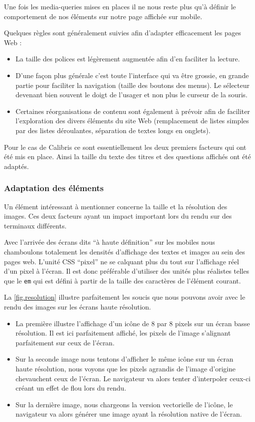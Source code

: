 \documentclass[12pt,a4paper]{book}
\begin{document}
Une fois les media-queries mises en places il ne nous reste plus qu'à définir le comportement de nos éléments sur notre page affichée sur mobile.

Quelques règles sont généralement suivies afin d'adapter efficacement les pages Web :
\begin{itemize}
  \item La taille des polices est légèrement augmentée afin d'en faciliter la lecture.
  \item D'une façon plus générale c'est toute l'interface qui va être grossie, en grande partie pour faciliter la navigation (taille des boutons des menus). Le sélecteur devenant bien souvent le doigt de l'usager et non plus le curseur de la souris.
  \item Certaines réorganisations de contenu sont également à prévoir afin de faciliter l'exploration des divers éléments du site Web (remplacement de listes simples par des listes déroulantes, séparation de textes longs en onglets).
\end{itemize}

Pour le cas de Calibris ce sont essentiellement les deux premiers facteurs qui ont été mis en place. Ainsi la taille du texte des titres et des questions affichés ont été adaptés.

\subsubsection{Adaptation des éléments}

Un élément intéressant à mentionner concerne la taille et la résolution des images. Ces deux facteurs ayant un impact important lors du rendu sur des terminaux différents.

Avec l'arrivée des écrans dits ``à haute définition'' sur les mobiles nous chamboulons totalement les densités d'affichage des textes et images au sein des pages web. L'unité CSS ``pixel'' ne se calquant plus du tout sur l'affichage réel d'un pixel à l'écran. Il est donc préférable d'utiliser des unités plus réalistes telles que le \texttt{em} qui est défini à partir de la taille des caractères de l'élément courant.

La \cref{fig.resolution} illustre parfaitement les soucis que nous pouvons avoir avec le rendu des images sur les écrans haute résolution. 

\begin{itemize}
  \item La première illustre l'affichage d'un icône de 8 par 8 pixels sur un écran basse résolution. Il est ici parfaitement affiché, les pixels de l'image s'alignant parfaitement sur ceux de l'écran.
  \item Sur la seconde image nous tentons d'afficher le même icône sur un écran haute résolution, nous voyons que les pixels agrandis de l'image d'origine chevauchent ceux de l'écran. Le navigateur va alors tenter d'interpoler ceux-ci créant un effet de flou lors du rendu.
  \item Sur la dernière image, nous chargeons la version vectorielle de l'icône, le navigateur va alors générer une image ayant la résolution native de l'écran.
\end{itemize}
\end{document}
